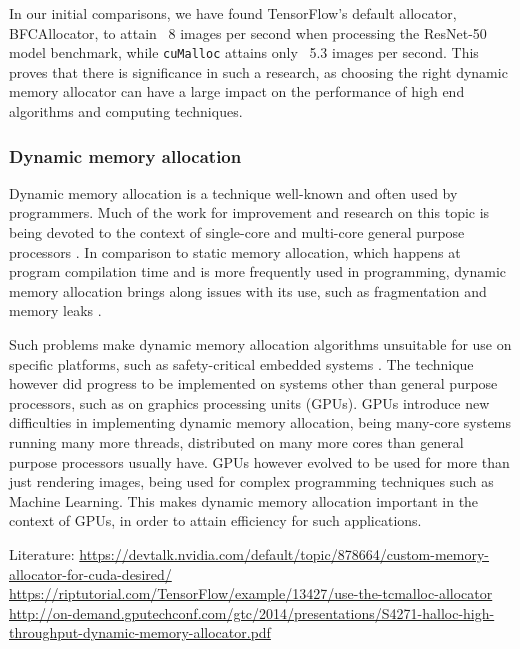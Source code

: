 \documentclass[12pt,twoside]{article}
\begin{document}
In our initial comparisons, we have found TensorFlow's default allocator, BFCAllocator, to attain ~8 images per second when processing the ResNet-50 model benchmark, while \texttt{cuMalloc} attains only ~5.3 images per second. This proves that there is significance in such a research, as choosing the right dynamic memory allocator can have a large impact on the performance of high end algorithms and computing techniques.

\subsubsection*{Dynamic memory allocation}

Dynamic memory allocation is a technique well-known and often used by programmers. Much of the work for improvement and research on this topic is being devoted to the context of single-core and multi-core general purpose processors \cite{YOU2015}. In comparison to static memory allocation, which happens at program compilation time and is more frequently used in programming, dynamic memory allocation brings along issues with its use, such as fragmentation and memory leaks \cite{TRAISTER199099}.

Such problems make dynamic memory allocation algorithms unsuitable for use on specific platforms, such as safety-critical embedded systems \cite{Puaut_2002}. The technique however did progress to be implemented on systems other than general purpose processors, such as on graphics processing units (GPUs). GPUs introduce new difficulties in implementing dynamic memory allocation, being many-core systems running many more threads, distributed on many more cores than general purpose processors usually have. GPUs however evolved to be used for more than just rendering images, being used for complex programming techniques such as Machine Learning. This makes dynamic memory allocation important in the context of GPUs, in order to attain efficiency for such applications. %

Literature:
\url{https://devtalk.nvidia.com/default/topic/878664/custom-memory-allocator-for-cuda-desired/}
\url{https://riptutorial.com/TensorFlow/example/13427/use-the-tcmalloc-allocator}
\url{http://on-demand.gputechconf.com/gtc/2014/presentations/S4271-halloc-high-throughput-dynamic-memory-allocator.pdf}
\end{document}
